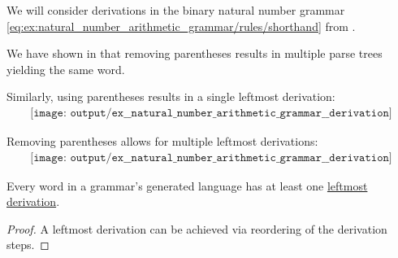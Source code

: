 \begin{example}\label{ex:natural_number_arithmetic_grammar/derivation}
  We will consider derivations in the binary natural number grammar \eqref{eq:ex:natural_number_arithmetic_grammar/rules/shorthand} from .

  We have shown in  that removing parentheses results in multiple parse trees yielding the same word.

  Similarly, using parentheses results in a single leftmost derivation:
  \begin{equation*}
    \begin{aligned}
      \texttt{[image: output/ex\_\_natural\_number\_arithmetic\_grammar\_\_derivation]}
    \end{aligned}
  \end{equation*}

  Removing parentheses allows for multiple leftmost derivations:
  \begin{equation*}
    \begin{aligned}
      \texttt{[image: output/ex\_\_natural\_number\_arithmetic\_grammar\_\_derivation]}
    \end{aligned}
  \end{equation*}
\end{example}

\begin{proposition}\label{thm:leftmost_derivation_existence}
  Every word in a grammar's generated language has at least one \hyperref[def:leftmost_derivation]{leftmost derivation}.
\end{proposition}
\begin{proof}
  A leftmost derivation can be achieved via reordering of the derivation steps.
\end{proof}


